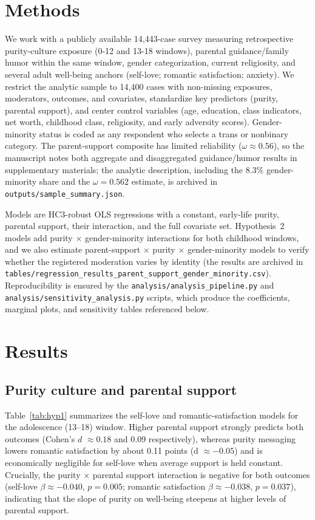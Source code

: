 \documentclass[12pt]{article}
\begin{document}
\section{Methods}
We work with a publicly available 14,443-case survey measuring retrospective purity-culture exposure (0-12 and 13-18 windows), parental guidance/family humor within the same window, gender categorization, current religiosity, and several adult well-being anchors (self-love; romantic satisfaction; anxiety). We restrict the analytic sample to 14,400 cases with non-missing exposures, moderators, outcomes, and covariates, standardize key predictors (purity, parental support), and center control variables (age, education, class indicators, net worth, childhood class, religiosity, and early adversity scores). Gender-minority status is coded as any respondent who selects a trans or nonbinary category. The parent-support composite has limited reliability ($\omega \approx 0.56$), so the manuscript notes both aggregate and disaggregated guidance/humor results in supplementary materials; the analytic description, including the 8.3\% gender-minority share and the $\omega=0.562$ estimate, is archived in \texttt{outputs/sample\_summary.json}.

Models are HC3-robust OLS regressions with a constant, early-life purity, parental support, their interaction, and the full covariate set. Hypothesis~2 models add purity × gender-minority interactions for both childhood windows, and we also estimate parent-support × purity × gender-minority models to verify whether the registered moderation varies by identity (the results are archived in \texttt{tables/regression\_results\_parent\_support\_gender\_minority.csv}). Reproducibility is ensured by the \texttt{analysis/analysis\_pipeline.py} and \texttt{analysis/sensitivity\_analysis.py} scripts, which produce the coefficients, marginal plots, and sensitivity tables referenced below.

\section{Results}
\subsection{Purity culture and parental support}
Table~\ref{tab:hyp1} summarizes the self-love and romantic-satisfaction models for the adolescence (13--18) window. Higher parental support strongly predicts both outcomes (Cohen's $d$ $\approx 0.18$ and 0.09 respectively), whereas purity messaging lowers romantic satisfaction by about 0.11 points (d $\approx -0.05$) and is economically negligible for self-love when average support is held constant. Crucially, the purity × parental support interaction is negative for both outcomes (self-love $\beta \approx -0.040$, $p=0.005$; romantic satisfaction $\beta \approx -0.038$, $p=0.037$), indicating that the slope of purity on well-being steepens at higher levels of parental support.
\end{document}
